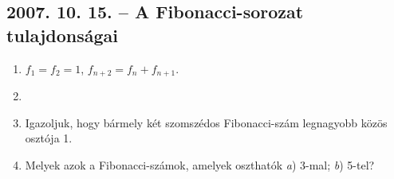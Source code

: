 \subsection*{2007. 10. 15. -- A Fibonacci-sorozat tulajdonságai}
\begin{enumerate}
\item $f_1=f_2=1$, $f_{n+2}=f_n+f_{n+1}$.
\item 
{}
\item Igazoljuk, hogy bármely két szomszédos Fibonacci-szám legnagyobb közös osztója 1.
\item Melyek azok a Fibonacci-számok, amelyek oszthatók \textit{a}) 3-mal; \textit{b}) 5-tel?
\end{enumerate}

